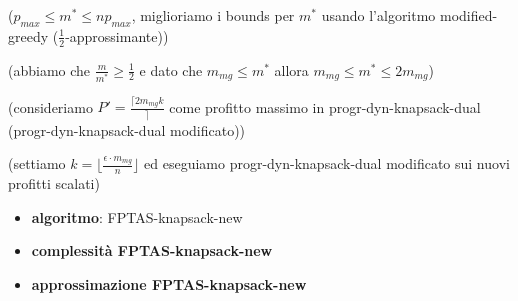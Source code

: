 (\(p_{max} \leq m^* \leq np_{max}\), miglioriamo i bounds per \(m^*\)
usando l'algoritmo modified-greedy (\({\frac{1}{2}}\)-approssimante))

(abbiamo che \({\frac{m}{m^*}} \geq {\frac{1}{2}}\) e dato che
\(m_{mg} \leq m^*\) allora \(m_{mg} \leq m^* \leq 2m_{mg}\))

(consideriamo \(P' = \frac{\lceil {{2m_{mg}}}{k}} \rceil\) come profitto
massimo in progr-dyn-knapsack-dual (progr-dyn-knapsack-dual modificato))

(settiamo \(k = \lfloor {\frac{\epsilon \cdot m_{mg}}{n}} \rfloor\) ed
eseguiamo progr-dyn-knapsack-dual modificato sui nuovi profitti scalati)

\begin{itemize}

\item
  \textbf{algoritmo}: FPTAS-knapsack-new
\item
  \textbf{complessità FPTAS-knapsack-new}
\item
  \textbf{approssimazione FPTAS-knapsack-new}
\end{itemize}

